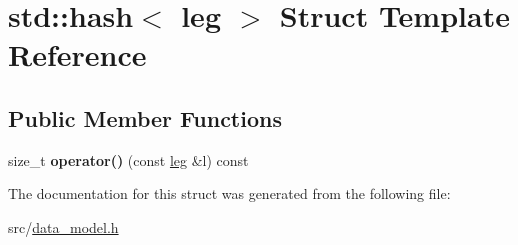 \hypertarget{structstd_1_1hash_3_01leg_01_4}{}\section{std\+:\+:hash$<$ leg $>$ Struct Template Reference}
\label{structstd_1_1hash_3_01leg_01_4}
\subsection*{Public Member Functions}
\begin{DoxyCompactItemize}
\item 
\mbox{\label{structstd_1_1hash_3_01leg_01_4_ae0aff468b8cdeac8d5a1fab1eed668c8}} 
size\+\_\+t {\bfseries operator()} (const \hyperlink{structleg}{leg} \&l) const
\end{DoxyCompactItemize}


The documentation for this struct was generated from the following file\+:\begin{DoxyCompactItemize}
\item 
src/\hyperlink{data__model_8h}{data\+\_\+model.\+h}\end{DoxyCompactItemize}
